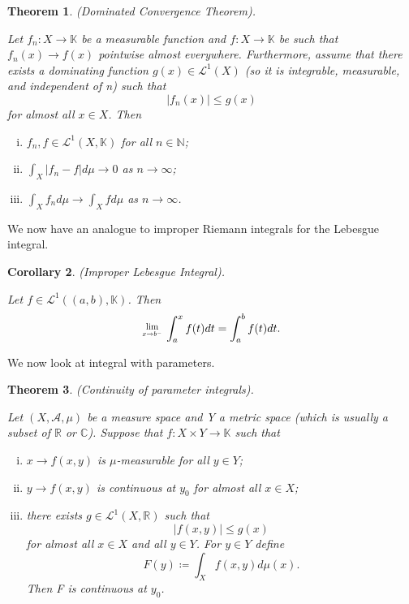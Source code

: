 \documentclass[twoside]{article}
\newcounter{lecnum}
\newcommand{\Lim}[1]{\raisebox{0.5ex}{\scalebox{0.8}{$\displaystyle \lim_{#1}\;$}}}
\newtheorem{theorem}{Theorem}[lecnum]
\newtheorem{corollary}[theorem]{Corollary}
\begin{document}
\begin{theorem}
(Dominated Convergence Theorem). 

Let $f_n:X \rightarrow \mathbb{K}$ be a measurable function and $f: X \rightarrow \mathbb{K}$ be such that $f_n(x) \rightarrow f(x)$ pointwise almost everywhere. Furthermore, assume that there exists a dominating function $g(x) \in \mathcal{L}^1(X)$ (so it is integrable, measurable, and independent of n) such that
$$
|f_n(x)| \leq g(x)
$$
for almost all $x \in X$. Then
\begin{enumerate}[(i)]
    \item $f_n, f \in \mathcal{L}^1(X, \mathbb{K})$ for all $n \in \mathbb{N}$;
    \item $\int_X|f_n - f|d\mu \rightarrow 0$ as $n \rightarrow \infty$;
    \item $\int_Xf_n d\mu \rightarrow \int_Xfd\mu$ as $n \rightarrow \infty$.
\end{enumerate}
\end{theorem}

We now have an analogue to improper Riemann integrals for the Lebesgue integral.

\begin{corollary}
(Improper Lebesgue Integral).

Let $f \in \mathcal{L}^1((a,b),\mathbb{K})$. Then
$$
\Lim{x \rightarrow b^-}\int_a^xf(t)dt = \int_a^bf(t)dt.
$$
\end{corollary}

We now look at integral with parameters.

\begin{theorem}(Continuity of parameter integrals).

Let $(X, \mathcal{A}, \mu)$ be a measure space and Y a metric space (which is usually a subset of $\mathbb{R}$ or $\mathbb{C}$). Suppose that $f: X \times Y \rightarrow \mathbb{K}$ such that
\begin{enumerate}[(i)]
    \item $x \rightarrow f(x,y)$ is $\mu$-measurable for all $y \in Y$;
    \item $y \rightarrow f(x,y)$ is continuous at $y_0$ for almost all $x \in X$;
    \item there exists $g \in \mathcal{L}^1(X, \mathbb{R})$ such that
    $$
    |f(x,y)| \leq g(x)
    $$
    for almost all $x \in X$ and all $y \in Y$. For $y \in Y$ define
    $$
    F(y) \coloneqq \int_X f(x,y)d\mu(x).
    $$
    Then F is continuous at $y_0$.
\end{enumerate}
\end{theorem}
\end{document}
